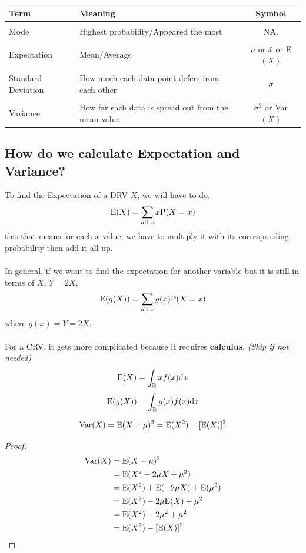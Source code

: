 \documentclass[../setup.tex]{subfiles}
\begin{document}
\begin{tabular}{| l | l | c |}
\hline 
Term & Meaning & Symbol \\
\hline 
& & \\
Mode & Highest probability/Appeared the most & NA.  \\
& & \\
Expectation & Mean/Average & $\mu$ or $\bar{x}$ or E$(X)$ \\
& & \\
Standard Deviation & How much each data point defers from each other & $\sigma$ \\
& & \\
Variance & How far each data is spread out from the mean value & $\sigma^2$ or Var$(X)$ \\
\hline 
\end{tabular} 
\clearpage

\subsection{How do we calculate Expectation and Variance?}

\begin{lemma}[Expectation]
To find the Expectation of a DRV $X$, we will have to do,
\[ \textup{E}(X) = \sum_{\text{all } x} x\textup{P}(X = x) \]
this that means for each $x$ value, we have to multiply it with its corresponding probability then add it all up. \\ \\
In general, if we want to find the expectation for another variable but it is still in terms of $X$, $Y=2X$,
\[ \textup{E}(g(X)) = \sum_{\text{all } x} g(x)\textup{P}(X = x) \]
where $g(x) = Y = 2X$. \\ \\
For a CRV, it gets more complicated because it requires \textbf{calculus}. \textit{(Skip if not needed)}
\[ \textup{E}(X) = \int_{\mathbb{R}} xf(x) \textup{d}x \]
\[ \textup{E}(g(X)) = \int_{\mathbb{R}} g(x)f(x) \textup{d}x \]
\end{lemma}

\begin{lemma}[Variance]
\[ \textup{Var}(X) = \textup{E}(X - \mu)^2 = \textup{E}(X^2) - [\textup{E}(X)]^2 \]
\end{lemma}
\begin{proof}
\begin{align*}
\textup{Var}(X) &= \textup{E}(X - \mu)^2 \\
&= \textup{E}(X^2 - 2\mu X + \mu^2) \\
&= \textup{E}(X^2) + \textup{E}(- 2\mu X) + \textup{E}(\mu^2) \\
&= \textup{E}(X^2) - 2\mu \textup{E}(X) + \mu^2 \\
&= \textup{E}(X^2) - 2\mu^2 + \mu^2 \\
&= \textup{E}(X^2) - [\textup{E}(X)]^2 \\
\end{align*}
\end{proof}
\clearpage
\end{document}
